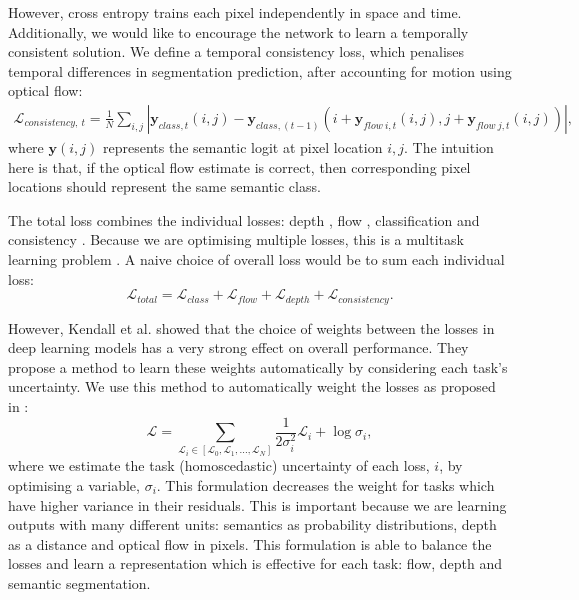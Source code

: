 However, cross entropy trains each pixel independently in space and time. Additionally, we would like to encourage the network to learn a temporally consistent solution. We define a temporal consistency loss, which penalises temporal differences in segmentation prediction, after accounting for motion using optical flow:
\begin{multline}
\mathcal{L}_{consistency,~t} = \frac{1}{N} \sum_{i,j} | \mathbf{y}_{class,t}(i,j) - \mathbf{y}_{class,(t-1)}(i+\mathbf{y}_{flow~i,t}(i,j),j+\mathbf{y}_{flow~j,t}(i,j)) |,
\label{eqn:consistency}
\end{multline}
where $\mathbf{y}(i,j)$ represents the semantic logit at pixel location $i,j$. The intuition here is that, if the optical flow estimate is correct, then corresponding pixel locations should represent the same semantic class.

The total loss combines the individual losses: depth , flow , classification and consistency . Because we are optimising multiple losses, this is a multitask learning problem \citep{caruana1998multitask}. A naive choice of overall loss would be to sum each individual loss:
\begin{equation}
\mathcal{L}_{total} = \mathcal{L}_{class} +\mathcal{L}_{flow} +\mathcal{L}_{depth} +\mathcal{L}_{consistency} .
\end{equation}

However, Kendall et al. \citep{kendall2017multi} showed that the choice of weights between the losses in deep learning models has a very strong effect on overall performance. They propose a method to learn these weights automatically by considering each task's uncertainty. We use this method to automatically weight the losses as proposed in \citep{kendall2017multi}:
\begin{equation}
\mathcal{L} = \sum_{\mathcal{L}_i \in [\mathcal{L}_{0}, \mathcal{L}_{1}, ..., \mathcal{L}_{N}]} \frac{1}{2 \sigma_i^2} \mathcal{L}_i + \log \sigma_i,
\label{eqn:multitask}
\end{equation}
where we estimate the task (homoscedastic) uncertainty of each loss, $i$, by optimising a variable, $\sigma_i$. This formulation decreases the weight for tasks which have higher variance in their residuals. This is important because we are learning outputs with many different units: semantics as probability distributions, depth as a distance and optical flow in pixels. This formulation is able to balance the losses and learn a representation which is effective for each task: flow, depth and semantic segmentation.

